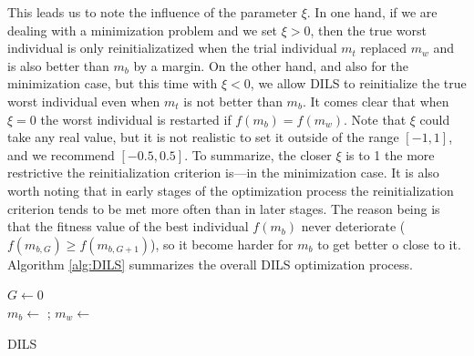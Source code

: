 \documentclass[review]{elsarticle}
\begin{document}
This leads us to note the influence of the parameter $\xi$. In one hand, if we are dealing with a minimization problem and we set $\xi > 0$, then the true worst individual is only reinitializatized when the trial individual $m_t$ replaced $m_w$ and is also better than $m_b$ by a margin. On the other hand, and also for the minimization case, but this time with $\xi < 0$, we allow DILS to reinitialize the true worst individual even when $m_t$ is not better than $m_b$. It comes clear that when $\xi = 0$ the worst individual is restarted if $f(m_b) = f(m_w)$. Note that $\xi$ could take any real value, but it is not realistic to set it outside of the range $[-1,1]$, and we recommend $[-0.5, 0.5]$. To summarize, the closer $\xi$ is to 1 the more restrictive the reinitialization criterion is---in the minimization case. It is also worth noting that in early stages of the optimization process the reinitialization criterion tends to be met more often than in later stages. The reason being is that the fitness value of the best individual $f(m_b)$ never deteriorate ($f(m_{b,G}) \ge f(m_{b,G+1})$), so it become harder for $m_b$ to get better o close to it.  Algorithm \ref{alg:DILS} summarizes the overall DILS optimization process.

\begin{algorithm}
	\SetNlSkip{0.5em}
	$G \leftarrow 0$\\
	$m_b \leftarrow$ \RandInit{};
	$m_w \leftarrow$ \RandInit{}\\
\caption{DILS}\label{alg:DILS}
\end{algorithm}
\end{document}
